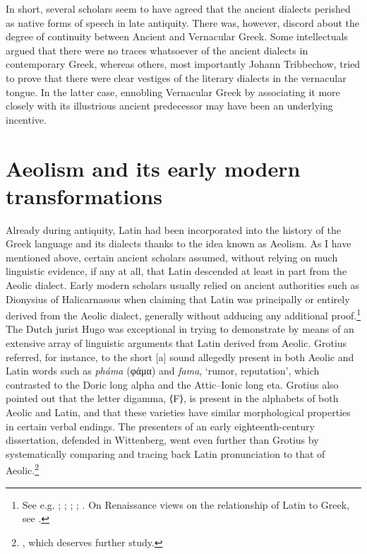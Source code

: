 In short, several scholars seem to have agreed that the ancient dialects perished as native forms of speech in late antiquity. There was, however, discord about the degree of continuity between Ancient and Vernacular Greek. Some intellectuals argued that there were no traces whatsoever of the ancient dialects in contemporary Greek, whereas others, most importantly Johann Tribbechow, tried to prove that there were clear vestiges of the literary dialects in the vernacular tongue. In the latter case, ennobling Vernacular Greek by associating it more closely with its illustrious ancient predecessor may have been an underlying incentive.

\section{Aeolism and its early modern transformations}\label{sec:5.6}

Already during antiquity, Latin had been incorporated into the history of the Greek language and its dialects thanks to the idea known as Aeolism. As I have mentioned above, certain ancient scholars assumed, without relying on much linguistic evidence, if any at all, that Latin descended at least in part from the Aeolic dialect. Early modern scholars usually relied on ancient authorities such as Dionysius of Halicarnassus when claiming that Latin was principally or entirely derived from the Aeolic dialect, generally without adducing any additional proof.\footnote{See e.g. \citet[84]{Crinesius1629}; \citet[\textsc{xvii}]{Bentley1726}; \citet[76, 106]{Hemsterhuis2015}; \citet[30]{Munthe1748}; \citet[215--216]{Simonis1752}. On Renaissance views on the relationship of Latin to Greek, see \citet{Tavoni1986}.} The Dutch jurist Hugo \citet[144--146]{Grotius1648} was exceptional in trying to demonstrate by means of an extensive array of linguistic arguments that Latin derived from Aeolic. Grotius referred, for instance, to the short [a] sound allegedly present in both Aeolic and Latin words such as \textit{pháma} (φάμα) and \textit{fama}, ‘rumor, reputation’, which contrasted to the Doric long alpha and the Attic–Ionic long eta. Grotius also pointed out that the letter digamma, ⟨F⟩, is present in the alphabets of both Aeolic and Latin, and that these varieties have similar morphological properties in certain verbal endings. The presenters of an early eighteenth-century dissertation, defended in Wittenberg, went even further than Grotius by systematically comparing and tracing back Latin pronunciation to that of Aeolic.\footnote{\citet{Thryllitsch1709}, which deserves further study.}

